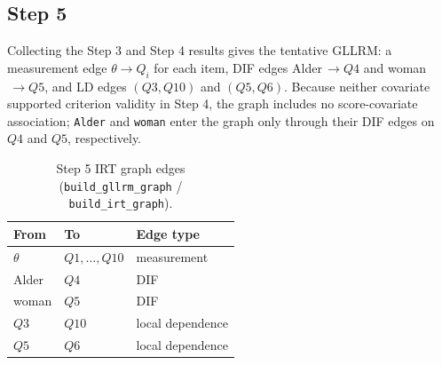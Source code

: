 \subsection{Step 5}
Collecting the Step 3 and Step 4 results gives the tentative GLLRM: a measurement edge $\theta\to Q_i$ for each item, DIF edges Alder$\,\to Q4$ and woman$\,\to Q5$, and LD edges $(Q3,Q10)$ and $(Q5,Q6)$. Because neither covariate supported criterion validity in Step 4, the graph includes no score-covariate association; \texttt{Alder} and \texttt{woman} enter the graph only through their DIF edges on $Q4$ and $Q5$, respectively.
\begin{table}[H]
\centering
\begin{tabular}{@{}lll@{}}
\toprule
From & To & Edge type \\
\midrule
$\theta$ & $Q1,\dots,Q10$ & measurement \\
Alder & $Q4$ & DIF \\
woman & $Q5$ & DIF \\
$Q3$ & $Q10$ & local dependence \\
$Q5$ & $Q6$ & local dependence \\
\bottomrule
\end{tabular}
\caption{Step 5 IRT graph edges (\texttt{build\_gllrm\_graph} / \texttt{build\_irt\_graph}).}
\label{tab:ak_step5}
\end{table}

